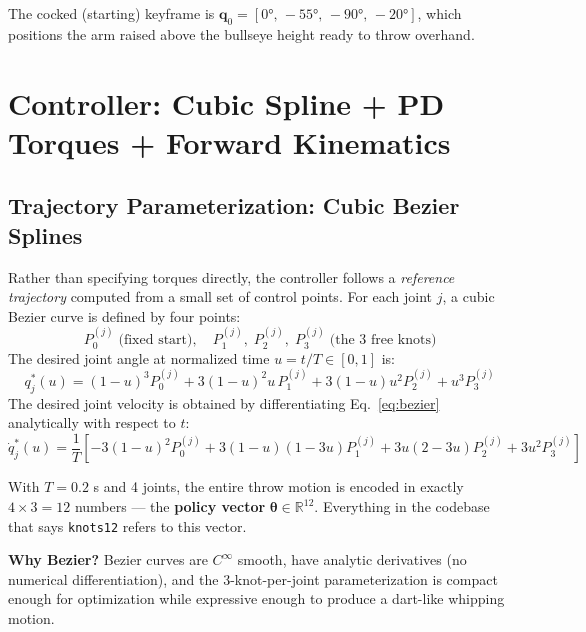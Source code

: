 \documentclass[11pt,letterpaper]{article}
\newcommand{\bq}{\bm{q}}
\begin{document}
The cocked (starting) keyframe is $\bq_0 = [0°,\,-55°,\,-90°,\,-20°]$, which positions the arm raised above the bullseye height ready to throw overhand.

\section{Controller: Cubic Spline + PD Torques + Forward Kinematics}

\subsection{Trajectory Parameterization: Cubic Bezier Splines}

Rather than specifying torques directly, the controller follows a \emph{reference trajectory} computed from a small set of control points. For each joint $j$, a cubic Bezier curve is defined by four points:
\[
  P_0^{(j)} \;\text{(fixed start)},\quad
  P_1^{(j)},\; P_2^{(j)},\; P_3^{(j)} \;\text{(the 3 free knots)}
\]
The desired joint angle at normalized time $u = t/T \in [0,1]$ is:
\begin{equation}
  q_j^*(u) = (1-u)^3 P_0^{(j)}
           + 3(1-u)^2 u\, P_1^{(j)}
           + 3(1-u) u^2 P_2^{(j)}
           + u^3 P_3^{(j)}
  \label{eq:bezier}
\end{equation}
The desired joint velocity is obtained by differentiating Eq.~\eqref{eq:bezier} analytically with respect to $t$:
\begin{equation}
  \dot{q}_j^*(u) = \frac{1}{T}\left[
    -3(1-u)^2 P_0^{(j)}
    + 3(1-u)(1-3u) P_1^{(j)}
    + 3u(2-3u) P_2^{(j)}
    + 3u^2 P_3^{(j)}
  \right]
\end{equation}

With $T = 0.2$ s and 4 joints, the entire throw motion is encoded in exactly $4 \times 3 = 12$ numbers — the \textbf{policy vector} $\bm{\theta} \in \mathbb{R}^{12}$. Everything in the codebase that says \texttt{knots12} refers to this vector.

\begin{infobox}
  \textbf{Why Bezier?} Bezier curves are $C^\infty$ smooth, have analytic derivatives (no numerical differentiation), and the 3-knot-per-joint parameterization is compact enough for optimization while expressive enough to produce a dart-like whipping motion.
\end{infobox}
\end{document}
